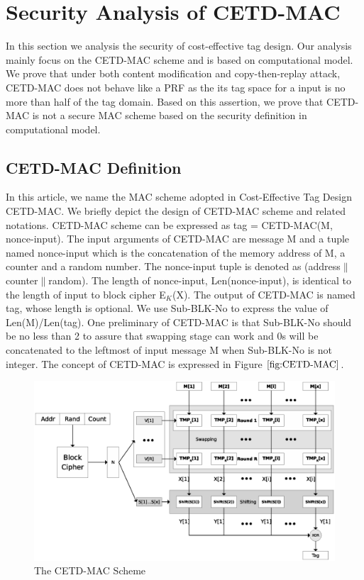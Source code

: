 

\section{Security Analysis of CETD-MAC}
In this section we analysis the security of cost-effective tag design. Our analysis mainly focus on the CETD-MAC scheme and is based on computational model. We prove that under both content modification and copy-then-replay attack, CETD-MAC does not behave like a PRF as the its tag space for a input is no more than half of the tag domain. Based on this assertion, we prove that CETD-MAC is not a secure MAC scheme based on the security definition in computational model.
\subsection{CETD-MAC Definition}
In this article, we name the MAC scheme adopted in Cost-Effective Tag Design\cite{cetd} CETD-MAC. We briefly depict the design of CETD-MAC scheme and related notations.
CETD-MAC scheme can be expressed as tag = CETD-MAC(M, nonce-input). The input arguments of CETD-MAC are message M and a tuple named nonce-input which is the concatenation of the memory address of M, a counter and a random number. The nonce-input tuple is denoted as (address$\|$counter$\|$random). The length of nonce-input, Len(nonce-input), is identical to the length of input to block cipher E$_K$(X). The output of CETD-MAC is named tag, whose length is optional. We use Sub-BLK-No to express the value of Len(M)/Len(tag). One preliminary of CETD-MAC is that Sub-BLK-No should be no less than 2 to assure that swapping stage can work and 0s will be concatenated to the leftmost of input message M when Sub-BLK-No is not integer.  
The concept of CETD-MAC is expressed in Figure $\ref{fig:CETD-MAC}$.
\begin{figure}[htbp]
 \centering
 \includegraphics[scale=0.6]{./diagrams/CETD.eps}
 \caption{The CETD-MAC Scheme}
 \label{fig:CETD-MAC}
\end{figure}

